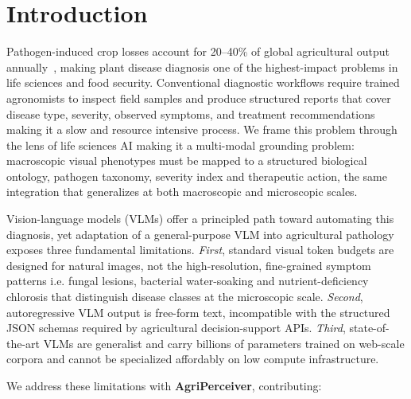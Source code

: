 \documentclass{article}
\newcommand{\ours}{AgriPerceiver}
\begin{document}
\section{Introduction}
\label{sec:intro}

Pathogen-induced crop losses account for 20--40\% of global agricultural output annually~\citep{savary2019global}, making plant disease diagnosis one of the highest-impact problems in life sciences and food security. Conventional diagnostic workflows require trained agronomists to inspect
field samples and produce structured reports that cover disease type, severity, observed symptoms, and treatment recommendations making it a slow and resource intensive process. We frame this problem through the lens of life sciences AI making it a multi-modal grounding problem: macroscopic visual phenotypes must be mapped to a
structured biological ontology, pathogen taxonomy, severity index and therapeutic action, the same integration that generalizes at both macroscopic and microscopic scales.

Vision-language models (VLMs) offer a principled path toward automating
this diagnosis, yet adaptation of a general-purpose VLM into agricultural pathology exposes three fundamental limitations.
\emph{First}, standard visual token budgets are designed for natural images, not the high-resolution, fine-grained symptom patterns i.e. fungal lesions, bacterial water-soaking and nutrient-deficiency chlorosis that distinguish disease classes at the microscopic scale. \emph{Second}, autoregressive VLM output is free-form text, incompatible with the structured JSON schemas required by agricultural decision-support APIs. \emph{Third}, state-of-the-art VLMs are generalist and carry billions of parameters
trained on web-scale corpora and cannot be specialized affordably on low compute infrastructure.

We address these limitations with \textbf{\ours{}}, contributing:
\end{document}
